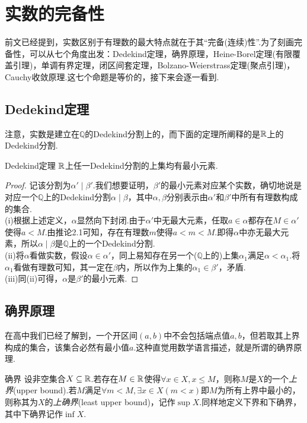 \section{实数的完备性}

前文已经提到，实数区别于有理数的最大特点就在于其“完备(连续)性”.为了刻画完备性，可以从七个角度出发：Dedekind定理，确界原理，Heine-Borel定理(有限覆盖引理)，单调有界定理，闭区间套定理，Bolzano-Weierstrass定理(聚点引理)，Cauchy收敛原理.这七个命题是等价的，接下来会逐一看到.

\subsection{Dedekind定理}

注意，实数是建立在$\mathbb{Q}$的Dedekind分割上的，而下面的定理所阐释的是$\mathbb{R}$上的Dedekind分割.

\begin{theorem}{Dedekind定理}
	$\mathbb{R}$上任一Dedekind分割的上集均有最小元素.
\end{theorem}
\begin{proof}
	记该分割为$\alpha ' \mid \beta '$.我们想要证明，$\beta '$的最小元素对应某个实数，确切地说是对应一个$\mathbb{Q}$上的Dedekind分割$\alpha \mid \beta$，其中$\alpha ,\beta$分别表示由$\alpha '$和$\beta '$中所有有理数构成的集合. \\
	(i)根据上述定义，$\alpha$显然向下封闭.由于$\alpha '$中无最大元素，任取$a \in \alpha$都存在$M \in \alpha '$使得$a < M$.由推论2.1可知，存在有理数$m$使得$a<m<M$.即得$\alpha$中亦无最大元素，所以$\alpha \mid \beta$是$\mathbb{Q}$上的一个Dedekind分割. \\
	(ii)将$\alpha$看做实数，假设$\alpha \in \alpha '$，同上易知存在另一个($\mathbb{Q}$上的)上集$\alpha _1$满足$\alpha < \alpha _1$.将$\alpha _1$看做有理数可知，其一定在$\beta$内，所以作为上集的$\alpha _1 \in \beta '$，矛盾. \\
	(iii)同(ii)可得，$\alpha$是$\beta '$的最小元素.
\end{proof}

\subsection{确界原理}

在高中我们已经了解到，一个开区间$(a,b)$中不会包括端点值$a,b$，但若取其上界构成的集合，该集合必然有最小值$a$.这种直觉用数学语言描述，就是所谓的确界原理.

\begin{definition}{确界}
	设非空集合$X \subseteq \mathbb{R}$.若存在$M \in \mathbb{R}$使得$\forall x \in X,x \leq M$，则称$M$是$X$的一个\textit{上界}(upper bound).若$M$满足$\forall m<M,\exists x \in X (m<x)$即$M$为所有上界中最小的，则称其为$X$的\textit{上确界}(least upper bound)，记作$\sup X$.同样地定义下界和下确界，其中下确界记作$\inf X$.
\end{definition}

